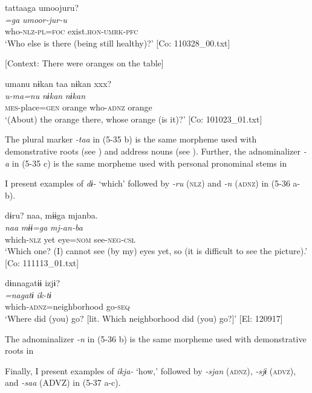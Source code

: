 \glll  tattaaga  umoojuru?\\
\textit{=ga}  \textit{umoor-jur-u}\\
who-\textsc{nlz}-\textsc{pl}=\textsc{foc}  exist.\textsc{hon}-\textsc{umrk}-\textsc{pfc}\\
\glt ‘Who else is there (being still healthy)?’ [Co: 110328\_00.txt]

 \ex \label{ex:35:c} [Context: There were oranges on the table]

\glll  umanu  nɨkan  taa  nɨkan   xxx?\\
\textit{u-ma=nu}  \textit{nɨkan}  \textit{}  \textit{nɨkan}  \\
\textsc{mes}-place=\textsc{gen}  orange  who-\textsc{adnz}  orange  \\
\glt ‘(About) the orange there, whose orange (is it)?’ [Co: 101023\_01.txt]
\z
\z

The plural marker \textit{-taa} in (5-35 b) is the same morpheme used with demonstrative roots (see ) and address nouns (see ). Further, the adnominalizer \textit{{}-a} in (5-35 c) is the same morpheme used with personal pronominal stems in 

  I present examples of \textit{dɨ-} ‘which’ followed by \textit{{}-ru} (\textsc{nlz}) and \textit{{}-n} (\textsc{adnz}) in (5-36 a-b).

\ea \label{ex:5:36}  \ea \label{ex:5:a} %
\glll  dɨru?  naa,  mɨɨga  mjanba.\\
\textit{}  \textit{naa}  \textit{mɨɨ=ga}  \textit{mj-an-ba}\\
which-\textsc{nlz}  yet  eye=\textsc{nom}  see-\textsc{neg}-\textsc{csl}\\
\glt ‘Which one? (I) cannot see (by my) eyes yet, so (it is difficult to see the picture).’ [Co: 111113\_01.txt]

 \ex \label{ex:5:b} %
\glll  dɨnnagatɨɨ  izjɨ?\\
\textit{=nagatɨ}  \textit{ik-tɨ}\\
which-\textsc{adnz}=neighborhood  go-\textsc{seq}\\
\glt ‘Where did (you) go? [lit. Which neighborhood did (you) go?]’ [El: 120917]
\z
\z

The adnominalizer \textit{{}-n} in (5-36 b) is the same morpheme used with demonstrative roots in 

  Finally, I present examples of \textit{ikja-} ‘how,’ followed by \textit{{}-sjan} (\textsc{adnz}), \textit{{}-sjɨ} (\textsc{advz}), and \textit{{}-saa} (ADVZ) in (5-37 a-c).

